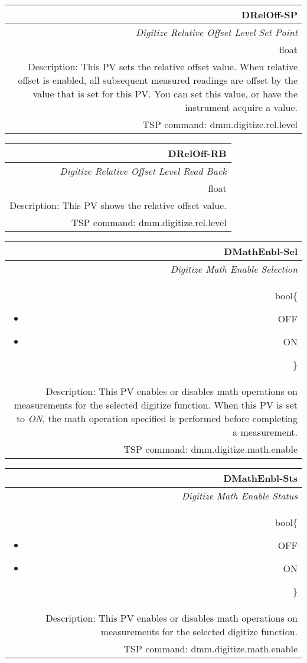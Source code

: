 \documentclass[openany]{article}
\begin{document}
		\begin{tabular}{N}
			\hline
			\bfseries DRelOff-SP\label{pv:dreloff-sp} \\ \hline
			\emph{Digitize Relative Offset Level Set Point} \\
			float \\
			Description: This PV sets the relative offset value. When relative offset is enabled, all subsequent measured readings are offset by the value that is set for this PV. You can set this value, or have the instrument acquire a value. \\
			TSP command: dmm.digitize.rel.level
		\end{tabular}

		\begin{tabular}{N}
			\hline
			\bfseries DRelOff-RB\label{pv:dreloff-rb} \\ \hline
			\emph{Digitize Relative Offset Level Read Back} \\
			float \\
			Description: This PV shows the relative offset value. \\
			TSP command: dmm.digitize.rel.level
		\end{tabular}

		\begin{tabular}{N}
			\hline
			\bfseries DMathEnbl-Sel\label{pv:dmathenbl-sel} \\ \hline
			\emph{Digitize Math Enable Selection} \\
			bool\{\begin{itemize}[noitemsep]
				\small
				\item[] OFF
				\item[] ON
			\end{itemize}\} \\
			Description: This PV enables or disables math operations on measurements for the selected digitize function. When this PV is set to \emph{ON}, the math operation specified is performed before completing a measurement. \\
			TSP command: dmm.digitize.math.enable
		\end{tabular}

		\begin{tabular}{N}
			\hline
			\bfseries DMathEnbl-Sts\label{pv:dmathenbl-sts} \\ \hline
			\emph{Digitize Math Enable Status} \\
			bool\{\begin{itemize}[noitemsep]
				\small
				\item[] OFF
				\item[] ON
			\end{itemize}\} \\
			Description: This PV enables or disables math operations on measurements for the selected digitize function. \\
			TSP command: dmm.digitize.math.enable
		\end{tabular}
\end{document}
